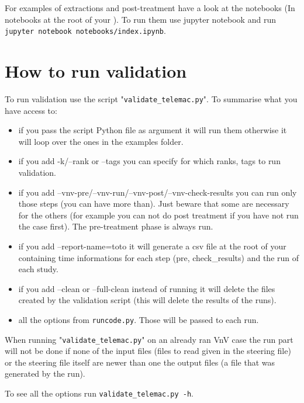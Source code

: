 For examples of extractions and post-treatment have a look at the notebooks (In
notebooks at the root of your \telemacsystem). To run them use jupyter notebook
and run \verb!jupyter notebook notebooks/index.ipynb!.

\section{How to run validation}

To run validation use the script "\verb!validate_telemac.py!".
To summarise what you have access to:
\begin{itemize}
\item if you pass the script Python file as argument it will run them otherwise
  it will loop over the ones in the examples folder.
\item if you add -k/--rank or --tags you can specify for which ranks, tags to
  run validation.
\item if you add --vnv-pre/--vnv-run/--vnv-post/--vnv-check-results you can run
only those steps (you can have more than). Just beware that some are necessary
for the others (for example you can not do post treatment if you have not run
the case first). The pre-treatment phase is always run.
\item if you add --report-name=toto it will generate a csv file at the root of
  your \telemacsystem{} containing time informations for each step (pre,
    check\_results) and the run of each study.
\item if you add --clean or --full-clean instead of running it will delete the
  files created by the validation script (this will delete the results of the
    runs).
\item all the options from \verb!runcode.py!. Those will be passed to each run.
\end{itemize}

When running "\verb!validate_telemac.py!" on an already ran VnV case the run
part will not be done if none of the input files (files to read given in the steering file)
or the steering file itself are newer than one the output files (a file that was
generated by the run).

To see all the options run \verb!validate_telemac.py -h!.
